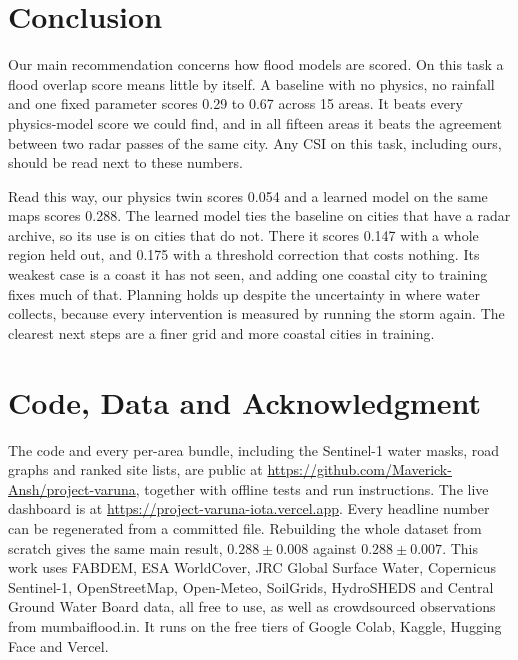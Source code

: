 \documentclass[conference]{IEEEtran}
\begin{document}
\section{Conclusion}
\label{sec:conclusion}
Our main recommendation concerns how flood models are scored. On this task a flood overlap score
means little by itself. A baseline with no physics, no rainfall and one fixed parameter scores 0.29
to 0.67 across 15 areas. It beats every physics-model score we could find, and in all fifteen areas
it beats the agreement between two radar passes of the same city. Any CSI on this task, including
ours, should be read next to these numbers.

Read this way, our physics twin scores 0.054 and a learned model on the same maps scores 0.288. The
learned model ties the baseline on cities that have a radar archive, so its use is on cities that do
not. There it scores 0.147 with a whole region held out, and 0.175 with a threshold correction that
costs nothing. Its weakest case is a coast it has not seen, and adding one coastal city to training
fixes much of that. Planning holds up despite the uncertainty in where water collects, because every
intervention is measured by running the storm again. The clearest next steps are a finer grid and
more coastal cities in training.

\section*{Code, Data and Acknowledgment}
The code and every per-area bundle, including the Sentinel-1 water masks, road graphs and ranked
site lists, are public at \url{https://github.com/Maverick-Ansh/project-varuna}, together with
offline tests and run instructions. The live dashboard is at
\url{https://project-varuna-iota.vercel.app}. Every headline number can be regenerated from a
committed file. Rebuilding the whole dataset from scratch gives the same main result, $0.288 \pm
0.008$ against $0.288 \pm 0.007$. This work uses FABDEM, ESA WorldCover, JRC Global Surface Water,
Copernicus Sentinel-1, OpenStreetMap, Open-Meteo, SoilGrids, HydroSHEDS and Central Ground Water
Board data, all free to use, as well as crowdsourced observations from mumbaiflood.in. It runs on
the free tiers of Google Colab, Kaggle, Hugging Face and Vercel.

\balance


\end{document}
